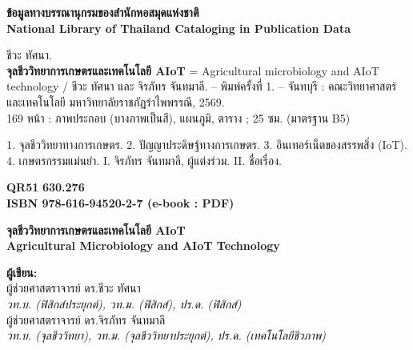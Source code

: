 \documentclass[10pt]{book}
\begin{document}
\frontmatter



\newpage
\thispagestyle{empty}
\vspace*{\fill}

\begin{center}
\textbf{\large ข้อมูลทางบรรณานุกรมของสำนักหอสมุดแห่งชาติ}\\
\textbf{National Library of Thailand Cataloging in Publication Data}
\end{center}

\vspace{0.2cm}
\begin{tcolorbox}[colback=white, colframe=black, boxrule=0.8pt, arc=0pt, left=10pt, right=10pt, top=8pt, bottom=8pt]
\small
ชีวะ ทัศนา.\\
\hspace*{1.5em}\textbf{จุลชีววิทยาการเกษตรและเทคโนโลยี AIoT} = Agricultural microbiology and AIoT technology / ชีวะ ทัศนา และ จิรภัทร จันทมาลี. -- พิมพ์ครั้งที่ 1. -- จันทบุรี : คณะวิทยาศาสตร์และเทคโนโลยี มหาวิทยาลัยราชภัฏรำไพพรรณี, 2569.\\
\hspace*{1.5em}169 หน้า : ภาพประกอบ (บางภาพเป็นสี), แผนภูมิ, ตาราง ; 25 ซม. (มาตรฐาน B5)

\vspace{0.3cm}
\hspace*{1.5em}1. จุลชีววิทยาทางการเกษตร. 2. ปัญญาประดิษฐ์ทางการเกษตร. 3. อินเทอร์เน็ตของสรรพสิ่ง (IoT). 4. เกษตรกรรมแม่นยำ. I. จิรภัทร จันทมาลี, ผู้แต่งร่วม. II. ชื่อเรื่อง.

\vspace{0.3cm}
\noindent\textbf{QR51} \hfill \textbf{630.276}\\
\textbf{ISBN 978-616-94520-2-7 (e-book : PDF)}
\end{tcolorbox}

\vspace{0.4cm}
\noindent\textbf{จุลชีววิทยาการเกษตรและเทคโนโลยี AIoT}\\
\textbf{Agricultural Microbiology and AIoT Technology}

\vspace{0.2cm}
\noindent\textbf{ผู้เขียน:}\\
ผู้ช่วยศาสตราจารย์ ดร.ชีวะ ทัศนา\\
\textit{วท.บ. (ฟิสิกส์ประยุกต์), วท.ม. (ฟิสิกส์), ปร.ด. (ฟิสิกส์)}\\
ผู้ช่วยศาสตราจารย์ ดร.จิรภัทร จันทมาลี\\
\textit{วท.บ. (จุลชีววิทยา), วท.ม. (จุลชีววิทยาประยุกต์), ปร.ด. (เทคโนโลยีชีวภาพ)}
\end{document}
